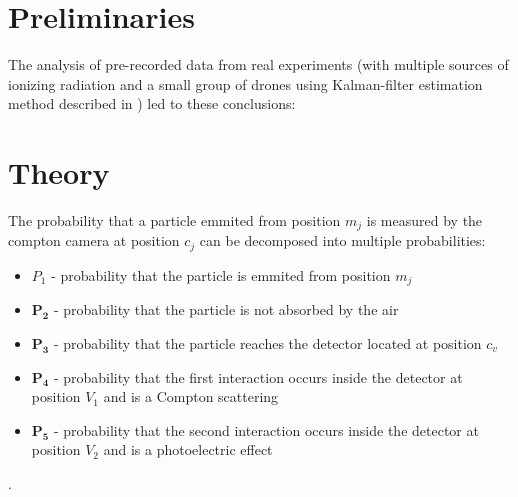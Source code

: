 
































\section{Preliminaries}
The analysis of pre-recorded data from real experiments (with multiple sources of ionizing radiation and a small group of drones using Kalman-filter estimation method described in \cite{Baca}) led to these conclusions:

\section{Theory}
The probability that a particle emmited from position $m_{j}$ is measured by the compton camera at position $c_{j}$ can be decomposed into multiple probabilities:
\begin{itemize}
  \item $P_{1}$ - probability that the particle is emmited from position $m_{j}$
  \item $\mathbf{P_{2}}$ - probability that the particle is not absorbed by the air
  \item $\mathbf{P_{3}}$ - probability that the particle reaches the detector located at position $c_{v}$
	\item $\mathbf{P_{4}}$ - probability that the first interaction occurs inside the detector at position $V_{1}$ and is a Compton scattering
  \item $\mathbf{P_{5}}$ - probability that the second interaction occurs inside the detector at position $V_{2}$ and is a photoelectric effect
\end{itemize}.

